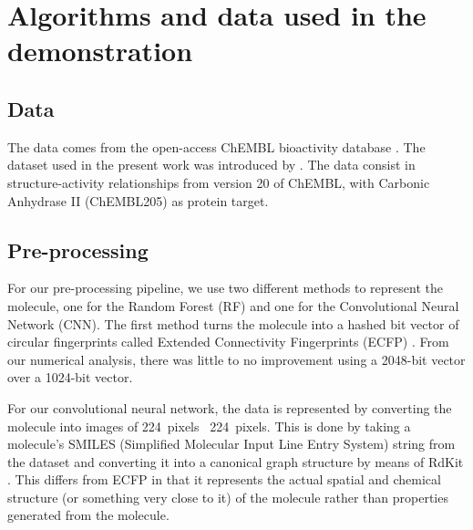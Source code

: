 \documentclass[\ifafour a4paper,12pt,\else a5paper,10pt,\fi%
onecolumn,oneside,article,%
british%
]{memoir}
\theoremstyle{remark}
\theoremstyle{innote}
\renewcommand*{\|}[1][]{\nonscript\:#1\vert\nonscript\:\mathopen{}}
\begin{document}
\clearpage
\bigskip
\renewcommand*{\appendixpagename}{Appendices: mathematical and technical details}
\appendix



\section{Algorithms and data used in the demonstration}
 
\subsection{Data} 
  
The data comes from the open-access ChEMBL bioactivity database \autocites{bentoetal2014}. The dataset used in the present work was introduced by \textcite{koutsoukasetal2017}. The data consist in structure-activity relationships from version 20 of ChEMBL, with Carbonic Anhydrase II (ChEMBL205) as protein target.


\subsection{Pre-processing} 

For our pre-processing pipeline, we use two different methods to represent the molecule, one for the Random Forest (RF) and one for the Convolutional Neural Network (CNN). The first method turns the molecule into a hashed bit vector of circular fingerprints called Extended Connectivity Fingerprints (ECFP) \autocites{rogersetal2010}. From our numerical analysis, there was little to no improvement using a 2048-bit vector over a 1024-bit vector. 
  
For our convolutional neural network, the data is represented by converting the molecule into images of 224~pixels \texttimes\ 224~pixels. This is done by taking a molecule's SMILES (Simplified Molecular Input Line Entry System) string \autocites{davidetal2020} from the dataset and converting it into a canonical graph structure by means of RdKit \autocites{rdkit2017}. This differs from ECFP in that it represents the actual spatial and chemical structure (or something very close to it) of the molecule rather than properties generated from the molecule.
\end{document}
